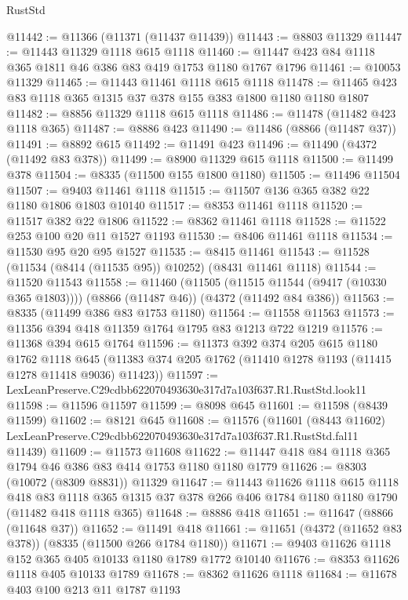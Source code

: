 \begin{lexlean}{RustStd}
\begin{coremodule}
@11442 := @11366 (@11371 (@11437 @11439))
@11443 := @8803 @11329
@11447 := @11443 @11329 @1118 @615 @1118
@11460 := @11447 @423 @84 @1118 @365 @1811 @46 @386 @83 @419 @1753 @1180 @1767 @1796
@11461 := @10053 @11329
@11465 := @11443 @11461 @1118 @615 @1118
@11478 := @11465 @423 @83 @1118 @365 @1315 @37 @378 @155 @383 @1800 @1180 @1180 @1807
@11482 := @8856 @11329 @1118 @615 @1118
@11486 := @11478 (@11482 @423 @1118 @365)
@11487 := @8886 @423
@11490 := @11486 (@8866 (@11487 @37))
@11491 := @8892 @615
@11492 := @11491 @423
@11496 := @11490 (@4372 (@11492 @83 @378))
@11499 := @8900 @11329 @615 @1118
@11500 := @11499 @378
@11504 := @8335 (@11500 @155 @1800 @1180)
@11505 := @11496 @11504
@11507 := @9403 @11461 @1118
@11515 := @11507 @136 @365 @382 @22 @1180 @1806 @1803 @10140
@11517 := @8353 @11461 @1118
@11520 := @11517 @382 @22 @1806
@11522 := @8362 @11461 @1118
@11528 := @11522 @253 @100 @20 @11 @1527 @1193
@11530 := @8406 @11461 @1118
@11534 := @11530 @95 @20 @95 @1527
@11535 := @8415 @11461
@11543 := @11528 (@11534 (@8414 (@11535 @95)) @10252) (@8431 @11461 @1118)
@11544 := @11520 @11543
@11558 := @11460
    (@11505 (@11515 @11544 (@9417 (@10330 @365 @1803))))
    (@8866 (@11487 @46))
    (@4372 (@11492 @84 @386))
@11563 := @8335 (@11499 @386 @83 @1753 @1180)
@11564 := @11558 @11563
@11573 := @11356 @394 @418 @11359 @1764 @1795 @83 @1213 @722 @1219
@11576 := @11368 @394 @615 @1764
@11596 := @11373
    @392
    @374
    @205
    @615
    @1180
    @1762
    @1118
    @645
    (@11383 @374 @205 @1762 (@11410 @1278 @1193 (@11415 @1278 @11418 @9036) @11423))
@11597 := LexLeanPreserve.C29cdbb622070493630e317d7a103f637.R1.RustStd.look11
@11598 := @11596 @11597
@11599 := @8098 @645
@11601 := @11598 (@8439 @11599)
@11602 := @8121 @645
@11608 := @11576
    (@11601
      (@8443 @11602)
      LexLeanPreserve.C29cdbb622070493630e317d7a103f637.R1.RustStd.fal11
      @11439)
@11609 := @11573 @11608
@11622 := @11447 @418 @84 @1118 @365 @1794 @46 @386 @83 @414 @1753 @1180 @1180 @1779
@11626 := @8303 (@10072 (@8309 @8831)) @11329
@11647 := @11443
    @11626
    @1118
    @615
    @1118
    @418
    @83
    @1118
    @365
    @1315
    @37
    @378
    @266
    @406
    @1784
    @1180
    @1180
    @1790
    (@11482 @418 @1118 @365)
@11648 := @8886 @418
@11651 := @11647 (@8866 (@11648 @37))
@11652 := @11491 @418
@11661 := @11651 (@4372 (@11652 @83 @378)) (@8335 (@11500 @266 @1784 @1180))
@11671 := @9403 @11626 @1118 @152 @365 @405 @10133 @1180 @1789 @1772 @10140
@11676 := @8353 @11626 @1118 @405 @10133 @1789
@11678 := @8362 @11626 @1118
@11684 := @11678 @403 @100 @213 @11 @1787 @1193

\end{coremodule}
\end{lexlean}
